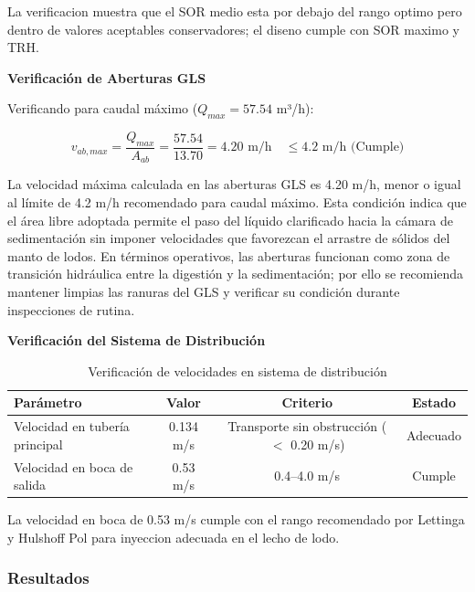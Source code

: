 \documentclass[12pt,a4paper]{article}
\begin{document}
La verificacion muestra que el SOR medio esta por debajo del rango optimo pero dentro de valores aceptables conservadores; el diseno cumple con SOR maximo y TRH.

\textbf{Verificación de Aberturas GLS}

Verificando para caudal máximo ($Q_{max} = 57.54$ m³/h):

\begin{equation}
v_{ab,max} = \frac{Q_{max}}{A_{ab}} = \frac{57.54}{13.70} = 4.20 \text{ m/h} \quad \leq 4.2 \text{ m/h } \text{(Cumple)}
\end{equation}

La velocidad máxima calculada en las aberturas GLS es 4.20 m/h, menor o igual al límite de 4.2 m/h recomendado para caudal máximo. Esta condición indica que el área libre adoptada permite el paso del líquido clarificado hacia la cámara de sedimentación sin imponer velocidades que favorezcan el arrastre de sólidos del manto de lodos. En términos operativos, las aberturas funcionan como zona de transición hidráulica entre la digestión y la sedimentación; por ello se recomienda mantener limpias las ranuras del GLS y verificar su condición durante inspecciones de rutina.

\textbf{Verificación del Sistema de Distribución}

\begin{table}[H]
\centering
\caption{Verificación de velocidades en sistema de distribución}
\begin{tabular}{lccc}
\toprule
\textbf{Parámetro} & \textbf{Valor} & \textbf{Criterio} & \textbf{Estado} \\
\midrule
Velocidad en tubería principal& 0.134 m/s & Transporte sin obstrucción ($<$ 0.20 m/s) & Adecuado \\
Velocidad en boca de salida & 0.53 m/s & 0.4--4.0 m/s & Cumple \\
\bottomrule
\end{tabular}
\end{table}

La velocidad en boca de 0.53 m/s cumple con el rango recomendado por Lettinga y Hulshoff Pol para inyeccion adecuada en el lecho de lodo.

\subsubsection{Resultados}
\end{document}
